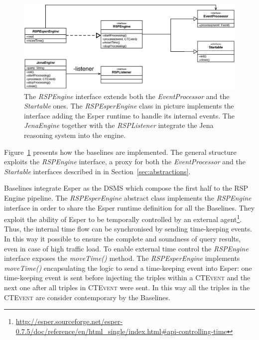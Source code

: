 \begin{figure}[tbh]
  \centering
	\includegraphics[width=\linewidth]{images/uml_baselines_general}
	\caption[\textit{RSPEngine} Implementation Trough Esper and Jena - UML Schema]{The \textit{RSPEngine} interface extends both the \textit{EventProcessor} and the \textit{Startable} ones. The \textit{RSPEsperEngine} class in picture implements the interface adding the Esper runtime to handle its internal events. The \textit{JenaEngine} together with the \textit{RSPListener} integrate the Jena reasoning system into the engine.}
  	\label{fig:uml_baselines_general}
\end{figure}

\noindent Figure~\ref{fig:uml_baselines_general} presents how the baselines are implemented. The general structure exploits the \textit{RSPEngine} interface, a proxy for both the \textit{EventProcessor} and the \textit{Startable} interfaces described in  in Section~\ref{sec:abstractions}. 

\name Baselines integrate Esper as the DSMS which compose the first half to the RSP Engine pipeline.  The \textit{RSPEsperEngine} abstract class implements the \textit{RSPEngine} interface in order to share the Esper runtime definition for all the Baselines.  They exploit the ability of Esper to be temporally controlled by an external agent\footnote{\url{http://esper.sourceforge.net/esper-0.7.5/doc/reference/en/html_single/index.html#api-controlling-time}}. Thus, the internal time flow can be synchronised by sending time-keeping events. In this way it possible to ensure the complete and soundness of query results, even in case of high traffic load. To enable external time control the \textit{RSPEngine} interface exposes the \textit{moveTime()} method.  The \textit{RSPEsperEngine} implements \textit{moveTime()} encapsulating the logic to send a time-keeping event into Esper: one time-keeping event is sent before injecting the triples within a \textsc{CTEvent} and the next one after all triples in \textsc{CTEvent} were sent. In this way all the triples in the \textsc{CTEvent} are consider contemporary by the Baselines. 


